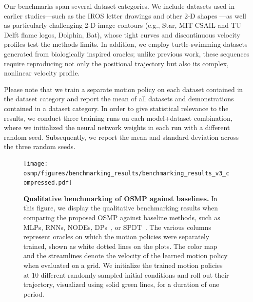 Our benchmarks span several dataset categories. We include datasets used in earlier studies—such as the IROS letter drawings \citep{urain2020imitationflow} and other 2-D shapes \citep{nawaz2024learning}—as well as particularly challenging 2-D image contours (e.g., Star, MIT CSAIL and TU Delft flame logos, Dolphin, Bat), whose tight curves and discontinuous velocity profiles test the methods limits. In addition, we employ turtle-swimming datasets generated from biologically inspired oracles; unlike previous work, these sequences require reproducing not only the positional trajectory but also its complex, nonlinear velocity profile. 

Please note that we train a separate motion policy on each dataset contained in the dataset category and report the mean of all datasets and demonstrations contained in a dataset category. In order to give statistical relevance to the results, we conduct three training runs on each model+dataset combination, where we initialized the neural network weights in each run with a different random seed. Subsequently, we report the mean and standard deviation across the three random seeds.

\begin{figure}[ht!]
    \centering
    \texttt{[image: osmp/figures/benchmarking\_results/benchmarking\_results\_v3\_compressed.pdf]}
    \caption{\textbf{Qualitative benchmarking of \gls{OSMP} against baselines.}
    In this figure, we display the qualitative benchmarking results when comparing the proposed \gls{OSMP} against baseline methods, such as \glspl{MLP}, \glspl{RNN}, \glspl{NODE}, \glspl{DP}~\citep{chi2023diffusion}, or \gls{SPDT}~\citep{zhi2024teaching}. The various columns represent oracles on which the motion policies were separately trained, shown as white dotted lines on the plots. The color map and the streamlines denote the velocity of the learned motion policy when evaluated on a grid. We initialize the trained motion policies at 10 different randomly sampled initial conditions and roll out their trajectory, visualized using solid green lines, for a duration of one period.
    }
    \label{fig:osmp:qualitative_benchmarking_results}
\end{figure}


